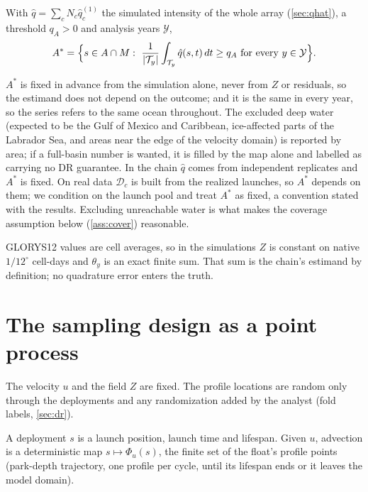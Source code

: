 \begin{definition}\label{def:domain}
With $\hat q=\sum_cN_c\hat q^{(1)}_c$ the simulated intensity of the whole array (\cref{sec:qhat}), a
threshold $q_A>0$ and analysis years $\mathcal Y$,
\[
  A^*=\Big\{s\in A\cap M:\ \frac1{|\T_y|}\int_{\T_y}\hat q(s,t)\,dt\ge q_A\ \text{for every }y\in\mathcal Y\Big\}.
\]
\end{definition}
$A^*$ is fixed in advance from the simulation alone, never from $Z$ or residuals, so the estimand
does not depend on the outcome; and it is the same in every year, so the series refers to the same
ocean throughout. The excluded deep water (expected to be the Gulf of Mexico and Caribbean,
ice-affected parts of the Labrador Sea, and areas near the edge of the velocity domain) is reported
by area; if a full-basin number is wanted, it is filled by the map alone and labelled as carrying no DR
guarantee. In the chain $\hat q$ comes from independent replicates and $A^*$ is fixed. On real data
$\mathcal D_c$ is built from the realized launches, so $A^*$ depends on them; we condition on the launch
pool and treat $A^*$ as fixed, a convention stated with the results. Excluding unreachable water is what makes the coverage
assumption below (\cref{ass:cover}) reasonable.

\begin{remark}\label{rem:glorys-estimand}
GLORYS12 values are cell averages, so in the simulations $Z$ is constant on native $1/12^\circ$
cell-days and $\theta_y$ is an exact finite sum. That sum is the chain's estimand by definition; no
quadrature error enters the truth.
\end{remark}

\section{The sampling design as a point process}\label{sec:design}

\begin{assumption}\label{ass:frame}
The velocity $u$ and the field $Z$ are fixed. The profile locations are random only through the
deployments and any randomization added by the analyst (fold labels, \cref{sec:dr}).
\end{assumption}

A deployment $s$ is a launch position, launch time and lifespan. Given $u$, advection is a
deterministic map $s\mapsto\Phi_u(s)$, the finite set of the float's profile points (park-depth
trajectory, one profile per cycle, until its lifespan ends or it leaves the model domain).


